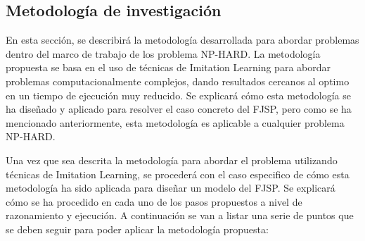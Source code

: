 \subsection{Metodología de investigación}
En esta sección, se describirá la metodología desarrollada para abordar problemas 
dentro del marco de trabajo de los problema NP-HARD. La metodología propuesta se 
basa en el uso de técnicas de Imitation Learning para abordar problemas computacionalmente
complejos, dando resultados cercanos al optimo en un tiempo de ejecución muy reducido. 
Se explicará cómo esta metodología se ha diseñado y aplicado para resolver el caso concreto 
del FJSP, pero como se ha mencionado anteriormente, esta metodología es aplicable a cualquier
problema NP-HARD.\medskip

Una vez que sea descrita la metodología para abordar el problema utilizando 
técnicas de Imitation Learning, se procederá con el caso especifico de cómo esta metodología 
ha sido aplicada para diseñar un modelo del FJSP. Se explicará cómo se ha procedido en cada uno 
de los pasos propuestos a nivel de razonamiento y ejecución. A continuación se van a listar una 
serie de puntos que se deben seguir para poder aplicar la metodología propuesta:

